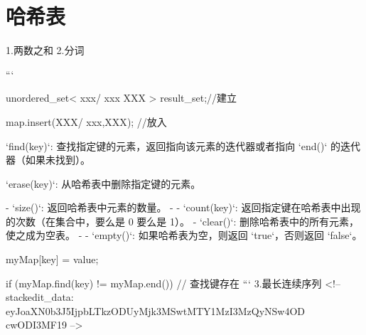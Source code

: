 \chapter{哈希表}



1.两数之和
2.分词

```

unordered_set< xxx/ xxx XXX > result_set;//建立

map.insert(XXX/ {xxx,XXX}); //放入

`find(key)`: 查找指定键的元素，返回指向该元素的迭代器或者指向 `end()` 的迭代器（如果未找到）。

`erase(key)`: 从哈希表中删除指定键的元素。

-   `size()`: 返回哈希表中元素的数量。
- -   `count(key)`: 返回指定键在哈希表中出现的次数（在集合中，要么是 0 要么是 1）。
-   `clear()`: 删除哈希表中的所有元素，使之成为空表。
- -   `empty()`: 如果哈希表为空，则返回 `true`，否则返回 `false`。

myMap[key] = value;

if (myMap.find(key) != myMap.end()) {
    // 查找键存在
}
```
3.最长连续序列
<!--stackedit_data:
eyJoaXN0b3J5IjpbLTkzODUyMjk3MSwtMTY1MzI3MzQyNSw4OD
cwODI3MF19
-->